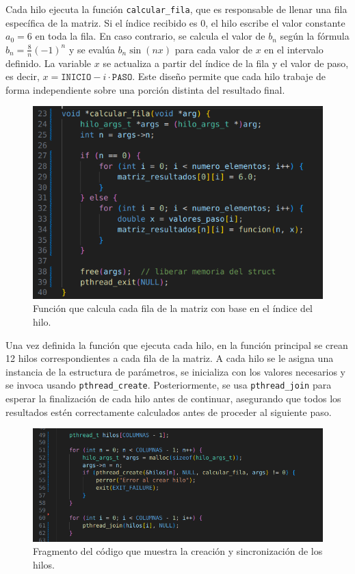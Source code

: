 {Cada hilo ejecuta la función \texttt{calcular\_fila}, que es responsable de llenar una fila específica de la matriz. Si el índice recibido es 0, el hilo escribe el valor constante $a_0 = 6$ en toda la fila. En caso contrario, se calcula el valor de $b_n$ según la fórmula $b_n = \frac{8}{n}(-1)^n$ y se evalúa $b_n \sin(nx)$ para cada valor de $x$ en el intervalo definido. La variable $x$ se actualiza a partir del índice de la fila y el valor de paso, es decir, $x = \texttt{INICIO} - i \cdot \texttt{PASO}$. Este diseño permite que cada hilo trabaje de forma independiente sobre una porción distinta del resultado final.

\begin{figure}[H]
    \centering
    \includegraphics[width=0.9\linewidth]{Figures/fase4/calcular_fila_fase4.png}
    \caption{Función que calcula cada fila de la matriz con base en el índice del hilo.}
    \label{fig:calcular-fila-fase4}
\end{figure}

Una vez definida la función que ejecuta cada hilo, en la función principal se crean 12 hilos correspondientes a cada fila de la matriz. A cada hilo se le asigna una instancia de la estructura de parámetros, se inicializa con los valores necesarios y se invoca usando \texttt{pthread\_create}. Posteriormente, se usa \texttt{pthread\_join} para esperar la finalización de cada hilo antes de continuar, asegurando que todos los resultados estén correctamente calculados antes de proceder al siguiente paso.

\begin{figure}[H]
    \centering
    \includegraphics[width=0.9\linewidth]{Figures/fase4/hilos_fase4.png}
    \caption{Fragmento del código que muestra la creación y sincronización de los hilos.}
    \label{fig:hilos-fase4}
\end{figure}

}
